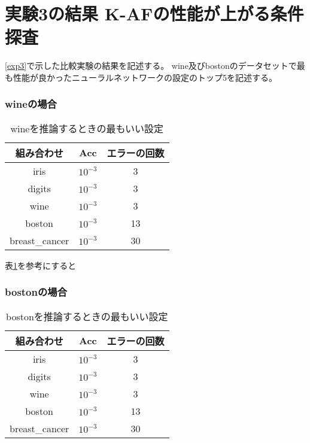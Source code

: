 \section{実験3の結果 K-AFの性能が上がる条件探査}
\label{evo3}
\ref{exp3}で示した比較実験の結果を記述する。
wine及びbostonのデータセットで最も性能が良かったニューラルネットワークの設定のトップ5を記述する。

\subsubsection{wineの場合}

\begin{table}[htbp]
    \begin{center}
        \caption{wineを推論するときの最もいい設定}
        \label{winebest}
        \vspace{2mm} 
        \begin{tabular}{ |c|c|c| }
        組み合わせ & Acc & エラーの回数 \\
        \hline
        iris           & $ 10^{-3} $    & 3 \\
        digits         & $ 10^{-3} $    & 3 \\
        wine           & $ 10^{-3} $    & 3 \\
        boston         & $ 10^{-3} $    & 13  \\
        breast\_cancer & $ 10^{-3} $    & 30 \\
        \end{tabular}
    \end{center}
\end{table}

表\ref{winebest}を参考にすると

\subsubsection{bostonの場合}

\begin{table}[htbp]
    \begin{center}
        \caption{bostonを推論するときの最もいい設定}
        \label{bostonbest}
        \vspace{2mm} 
        \begin{tabular}{ |c|c|c| }
        組み合わせ & Acc & エラーの回数 \\
        \hline
        iris           & $ 10^{-3} $    & 3 \\
        digits         & $ 10^{-3} $    & 3 \\
        wine           & $ 10^{-3} $    & 3 \\
        boston         & $ 10^{-3} $    & 13  \\
        breast\_cancer & $ 10^{-3} $    & 30 \\
        \end{tabular}
    \end{center}
\end{table}




